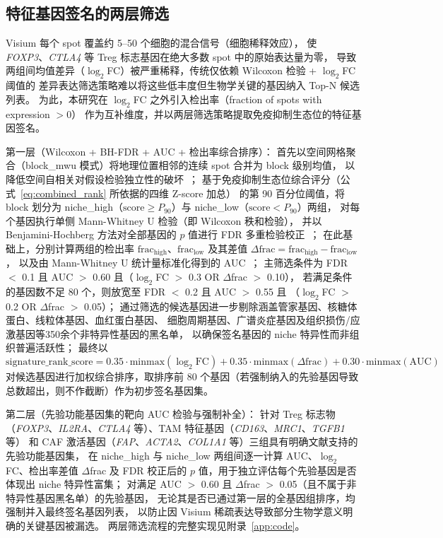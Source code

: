 \documentclass[12pt, a4paper]{ctexart}
\begin{document}
\subsection{特征基因签名的两层筛选}

Visium 每个 spot 覆盖约 5--50 个细胞的混合信号（细胞稀释效应），
使 \textit{FOXP3}、\textit{CTLA4} 等 Treg 标志基因在绝大多数 spot 中的原始表达量为零，
导致两组间均值差异（$\log_2$FC）被严重稀释，传统仅依赖 Wilcoxon 检验 + $\log_2$FC 阈值的
差异表达筛选策略难以将这些低丰度但生物学关键的基因纳入 Top-N 候选列表。
为此，本研究在 $\log_2$FC 之外引入检出率（fraction of spots with expression $>0$）
作为互补维度，并以两层筛选策略提取免疫抑制生态位的特征基因签名。

第一层（Wilcoxon + BH-FDR + AUC + 检出率综合排序）：
首先以空间网格聚合（block\_mwu 模式）将地理位置相邻的连续 spot 合并为 block 级别均值，
以降低空间自相关对假设检验独立性的破坏~\citep{palla2022squidpy}；
基于免疫抑制生态位综合评分（公式~\ref{eq:combined_rank} 所依据的四维 Z-score 加总）
的第 90 百分位阈值，将 block 划分为
niche\_high（$\text{score} \geq P_{90}$）与 niche\_low（$\text{score} < P_{90}$）两组，
对每个基因执行单侧 Mann-Whitney U 检验（即 Wilcoxon 秩和检验），
并以 Benjamini-Hochberg 方法对全部基因的 $p$ 值进行 FDR 多重检验校正~\citep{mann1947test}；
在此基础上，分别计算两组的检出率 $\text{frac}_{\text{high}}$、$\text{frac}_{\text{low}}$
及其差值 $\Delta\text{frac} = \text{frac}_{\text{high}} - \text{frac}_{\text{low}}$，
以及由 Mann-Whitney U 统计量标准化得到的 AUC~\citep{hanley1982meaning}；
主筛选条件为 FDR $<$ 0.1 且 AUC $>$ 0.60 且（$\log_2$FC $>$ 0.3 OR $\Delta$frac $>$ 0.10），
若满足条件的基因数不足 80 个，则放宽至 FDR $<$ 0.2 且 AUC $>$ 0.55 且
（$\log_2$FC $>$ 0.2 OR $\Delta$frac $>$ 0.05）；
通过筛选的候选基因进一步剔除涵盖管家基因、核糖体蛋白、线粒体基因、血红蛋白基因、
细胞周期基因、广谱炎症基因及组织损伤/应激基因等350余个非特异性基因的黑名单，
以确保签名基因的 niche 特异性而非组织普遍活跃性；
最终以
\begin{equation*}
\text{signature\_rank\_score} = 0.35 \cdot \text{minmax}(\log_2\text{FC}) + 0.35 \cdot \text{minmax}(\Delta\text{frac}) + 0.30 \cdot \text{minmax}(\text{AUC})
\label{eq:signature_rank_score}
\end{equation*}
对候选基因进行加权综合排序，取排序前 80 个基因（若强制纳入的先验基因导致总数超出，则不作截断）作为初步签名基因集。

第二层（先验功能基因集的靶向 AUC 检验与强制补全）：
针对 Treg 标志物（\textit{FOXP3}、\textit{IL2RA}、\textit{CTLA4} 等）、TAM 特征基因（\textit{CD163}、\textit{MRC1}、\textit{TGFB1} 等）
和 CAF 激活基因（\textit{FAP}、\textit{ACTA2}、\textit{COL1A1} 等）三组具有明确文献支持的先验功能基因集，
在 niche\_high 与 niche\_low 两组间逐一计算 AUC、$\log_2$FC、检出率差值 $\Delta$frac 及
FDR 校正后的 $p$ 值，用于独立评估每个先验基因是否体现出 niche 特异性富集；
对满足 AUC $>$ 0.60 且 $\Delta$frac $>$ 0.05（且不属于非特异性基因黑名单）的先验基因，
无论其是否已通过第一层的全基因组排序，均强制并入最终签名基因列表，
以防止因 Visium 稀疏表达导致部分生物学意义明确的关键基因被漏选。
两层筛选流程的完整实现见附录~\ref{app:code}。
\end{document}
